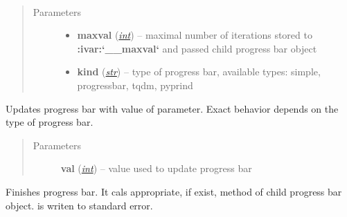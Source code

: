 \documentclass[a4paper,10pt,english]{sphinxmanual}
\begin{document}
\begin{fulllineitems}
\begin{fulllineitems}
\label{aqueduct.utils.log:aqueduct.utils.log.pbar.__init__}~\begin{quote}\begin{description}
\item[{Parameters}] \leavevmode\begin{itemize}
\item {} 
\textbf{maxval} (\href{http://docs.python.org/2/library/functions.html\#int}{\emph{int}}) -- maximal number of iterations stored to {\color{red}\bfseries{}:ivar:{}`\_\_maxval{}`} and passed child progress bar object

\item {} 
\textbf{kind} (\href{http://docs.python.org/2/library/functions.html\#str}{\emph{str}}) -- type of progress bar, available types: simple, progressbar, tqdm, pyprind

\end{itemize}

\end{description}\end{quote}

\end{fulllineitems}


\begin{fulllineitems}
\label{aqueduct.utils.log:aqueduct.utils.log.pbar.update}
Updates progress bar with value of  parameter. Exact behavior depends
on the type of progress bar.
\begin{quote}\begin{description}
\item[{Parameters}] \leavevmode
\textbf{val} (\href{http://docs.python.org/2/library/functions.html\#int}{\emph{int}}) -- value used to update progress bar

\end{description}\end{quote}

\end{fulllineitems}


\begin{fulllineitems}
\label{aqueduct.utils.log:aqueduct.utils.log.pbar.finish}
Finishes progress bar. It cals appropriate, if exist, method of child progress bar object.
is writen to standard error.

\end{fulllineitems}


\end{fulllineitems}
\end{document}
